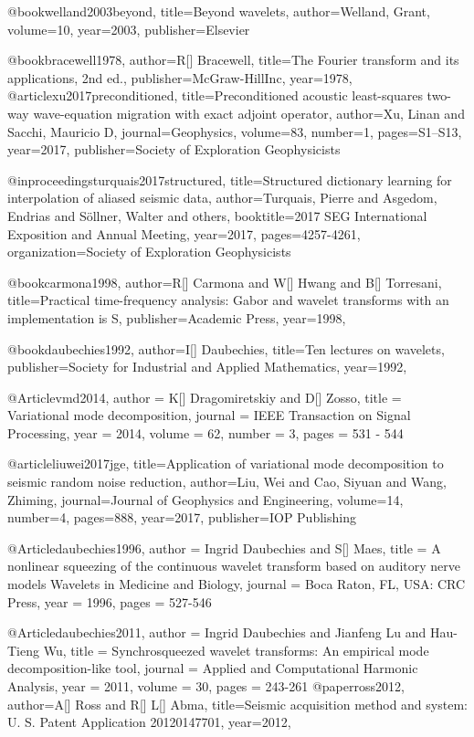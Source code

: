 @book{welland2003beyond,
  title={Beyond wavelets},
  author={Welland, Grant},
  volume={10},
  year={2003},
  publisher={Elsevier}
}


@book{bracewell1978,
  author={R[] Bracewell},
  title={The {F}ourier transform and its applications, 2nd ed.},
  publisher={McGraw-HillInc},
  year=1978,
}
@article{xu2017preconditioned,
  title={Preconditioned acoustic least-squares two-way wave-equation migration with exact adjoint operator},
  author={Xu, Linan and Sacchi, Mauricio D},
  journal={Geophysics},
  volume={83},
  number={1},
  pages={S1--S13},
  year={2017},
  publisher={Society of Exploration Geophysicists}
}


@inproceedings{turquais2017structured,
  title={Structured dictionary learning for interpolation of aliased seismic data},
  author={Turquais, Pierre and Asgedom, Endrias and S{\"o}llner, Walter and others},
  booktitle={2017 SEG International Exposition and Annual Meeting},
  year={2017},
  pages={4257-4261},
  organization={Society of Exploration Geophysicists}
}




@book{carmona1998,
  author={R[] Carmona and W[] Hwang and B[] Torresani},
  title={Practical time-frequency analysis: Gabor and wavelet transforms with an implementation is S},
  publisher={Academic Press},
  year=1998,
}

@book{daubechies1992,
  author={I[] Daubechies},
  title={Ten lectures on wavelets},
  publisher={Society for Industrial and Applied Mathematics},
  year=1992,
}

@Article{vmd2014,
  author = 	 {K[] Dragomiretskiy and D[] Zosso},
  title = 	 {Variational mode decomposition},
  journal = 	 {IEEE Transaction on Signal Processing},
  year = 	 2014,
  volume = 62,
  number = 3,
  pages = 	 {531 - 544}
}


@article{liuwei2017jge,
  title={Application of variational mode decomposition to seismic random noise reduction},
  author={Liu, Wei and Cao, Siyuan and Wang, Zhiming},
  journal={Journal of Geophysics and Engineering},
  volume={14},
  number={4},
  pages={888},
  year={2017},
  publisher={IOP Publishing}
}

@Article{daubechies1996,
  author = 	 {Ingrid Daubechies and S[] Maes},
  title = 	 {A nonlinear squeezing of the continuous wavelet transform based on auditory nerve models Wavelets in Medicine and Biology},
  journal = 	 {Boca Raton, FL, USA: CRC Press},
  year = 	 1996,
  pages = 	 {527-546}
}

@Article{daubechies2011,
  author = 	 {Ingrid Daubechies and Jianfeng Lu and Hau-Tieng Wu},
  title = 	 {Synchrosqueezed wavelet transforms: An empirical mode decomposition-like tool},
  journal = 	 {Applied and Computational Harmonic Analysis},
  year = 	 2011,
  volume = 	 30,
  pages = 	 {243-261}
}
@paper{ross2012,
  author={A[] Ross and R[] L[] Abma},
  title={Seismic acquisition method and system: U. S. Patent Application
20120147701},
  year=2012,
}

